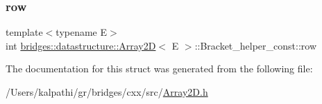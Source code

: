 \subsubsection{\texorpdfstring{row}{row}}
{\footnotesize\ttfamily template$<$typename E$>$ \\
int \mbox{\hyperlink{classbridges_1_1datastructure_1_1_array2_d}{bridges\+::datastructure\+::\+Array2D}}$<$ E $>$\+::Bracket\+\_\+helper\+\_\+const\+::row}



The documentation for this struct was generated from the following file\+:\begin{DoxyCompactItemize}
\item 
/\+Users/kalpathi/gr/bridges/cxx/src/\mbox{\hyperlink{_array2_d_8h}{Array2\+D.\+h}}\end{DoxyCompactItemize}
